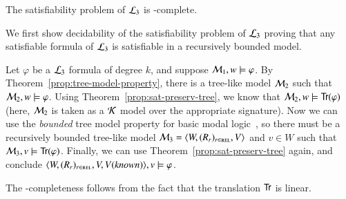 \begin{thm}\label{thm:fmp}
The satisfiability problem of $\mathcal{L}_3$ is \pspace-complete.
\end{thm}

\begin{pf}
We first show decidability of the satisfiability problem of
$\mathcal{L}_3$ proving that any satisfiable formula of $\mathcal{L}_3$ is
satisfiable in a recursively bounded model.

Let $\varphi$ be a $\mathcal{L}_3$ formula of degree $k$, and suppose
$\mathcal{M}_1,w \models \varphi$. By
Theorem~\ref{prop:tree-model-property}, there is a tree-like model
$\mathcal{M}_2$ such that $\mathcal{M}_2,w \models \varphi$. Using
Theorem~\ref{prop:sat-preserv-tree}, we know that $\mathcal{M}_2,w \models
{\sf Tr}(\varphi)$ (here, $\mathcal{M}_2$ is taken as a $\mathcal{K}$ model over the appropriate
signature). Now we can use the \emph{bounded} tree model property
for basic modal logic~\cite{BRV01}, so there must be a recursively
bounded tree-like model $\mathcal{M}_3=\langle W,(R_r)_{r \in \textsc{rel}},V \rangle$ and $v \in W$ such
that $\mathcal{M}_3,v \models {\sf Tr}(\varphi)$. Finally, we can use
Theorem~\ref{prop:sat-preserv-tree} again, and conclude
$\langle W,(R_r)_{r \in \textsc{rel}},V,V(\mathit{known}) \rangle,v \models \varphi$.
%

The \pspace-completeness follows from the fact that the translation
${\sf Tr}$ is linear.
\end{pf}




